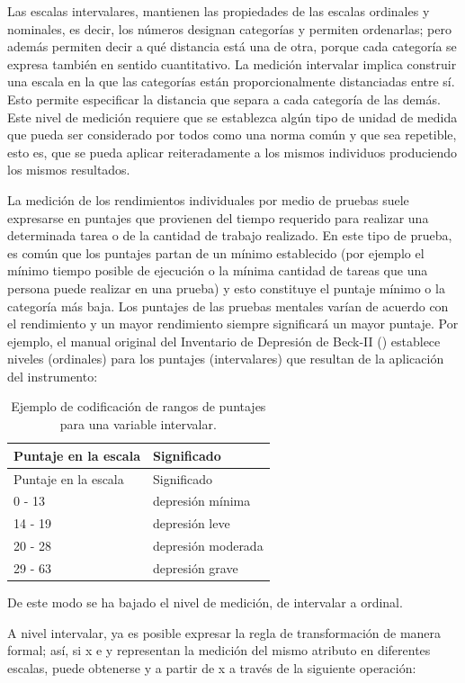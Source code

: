 \documentclass[]{book}
\begin{document}
Las escalas intervalares, mantienen las propiedades de las escalas ordinales y nominales, es decir, los números designan categorías y permiten ordenarlas; pero además permiten decir a qué distancia está una de otra, porque cada categoría se expresa también en sentido cuantitativo. La medición intervalar implica construir una escala en la que las categorías están proporcionalmente distanciadas entre sí. Esto permite especificar la distancia que separa a cada categoría de las demás. Este nivel de medición requiere que se establezca algún tipo de unidad de medida que pueda ser considerado por todos como una norma común y que sea repetible, esto es, que se pueda aplicar reiteradamente a los mismos individuos produciendo los mismos resultados.

La medición de los rendimientos individuales por medio de pruebas suele expresarse en puntajes que provienen del tiempo requerido para realizar una determinada tarea o de la cantidad de trabajo realizado. En este tipo de prueba, es común que los puntajes partan de un mínimo establecido (por ejemplo el mínimo tiempo posible de ejecución o la mínima cantidad de tareas que una persona puede realizar en una prueba) y esto constituye el puntaje mínimo o la categoría más baja. Los puntajes de las pruebas mentales varían de acuerdo con el rendimiento y un mayor rendimiento siempre significará un mayor puntaje. Por ejemplo, el manual original del Inventario de Depresión de Beck-II (\citet{Upton2013}) establece niveles (ordinales) para los puntajes (intervalares) que resultan de la aplicación del instrumento:

\begin{longtable}[]{@{}ll@{}}
\caption{\label{tab:unnamed-chunk-11}Ejemplo de codificación de rangos de puntajes para una variable intervalar.}\tabularnewline
\toprule
Puntaje en la escala & Significado\tabularnewline
\midrule
\endfirsthead
\toprule
Puntaje en la escala & Significado\tabularnewline
\midrule
\endhead
0 - 13 & depresión mínima\tabularnewline
14 - 19 & depresión leve\tabularnewline
20 - 28 & depresión moderada\tabularnewline
29 - 63 & depresión grave\tabularnewline
\bottomrule
\end{longtable}

De este modo se ha bajado el nivel de medición, de intervalar a ordinal.

A nivel intervalar, ya es posible expresar la regla de transformación de manera formal; así, si x e y representan la medición del mismo atributo en diferentes escalas, puede obtenerse y a partir de x a través de la siguiente operación:
\end{document}

